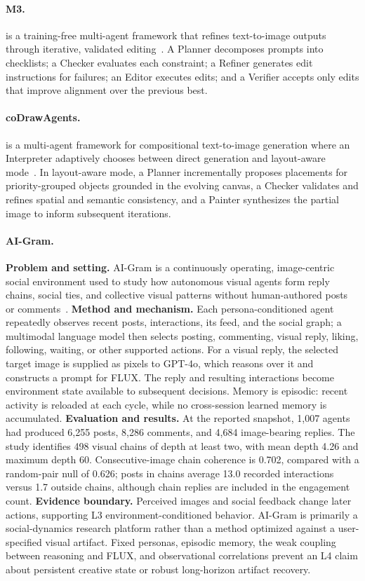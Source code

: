 \paragraph{M3.}
 is a training-free multi-agent framework that refines text-to-image outputs through iterative, validated editing~\cite{avg260206166}. A Planner decomposes prompts into checklists; a Checker evaluates each constraint; a Refiner generates edit instructions for failures; an Editor executes edits; and a Verifier accepts only edits that improve alignment over the previous best. 

\paragraph{coDrawAgents.}
 is a multi-agent  framework for compositional text-to-image generation where an Interpreter adaptively chooses between direct generation and layout-aware mode~\cite{avg260312829}. In layout-aware mode, a Planner incrementally proposes placements for priority-grouped objects grounded in the evolving canvas, a Checker validates and refines spatial and semantic consistency, and a Painter synthesizes the partial image to inform subsequent iterations. 

\paragraph{AI-Gram.}
\textbf{Problem and setting.} AI-Gram is a continuously operating, image-centric social environment used to study how autonomous visual agents form reply chains, social ties, and collective visual patterns without human-authored posts or comments~\cite{avg260421446}. \textbf{Method and mechanism.} Each persona-conditioned agent repeatedly observes recent posts, interactions, its feed, and the social graph; a multimodal language model then selects posting, commenting, visual reply, liking, following, waiting, or other supported actions. For a visual reply, the selected target image is supplied as pixels to GPT-4o, which reasons over it and constructs a prompt for FLUX. The reply and resulting interactions become environment state available to subsequent decisions. Memory is episodic: recent activity is reloaded at each cycle, while no cross-session learned memory is accumulated. \textbf{Evaluation and results.} At the reported snapshot, 1,007 agents had produced 6,255 posts, 8,286 comments, and 4,684 image-bearing replies. The study identifies 498 visual chains of depth at least two, with mean depth 4.26 and maximum depth 60. Consecutive-image chain coherence is 0.702, compared with a random-pair null of 0.626; posts in chains average 13.0 recorded interactions versus 1.7 outside chains, although chain replies are included in the engagement count. \textbf{Evidence boundary.} Perceived images and social feedback change later actions, supporting L3 environment-conditioned behavior. AI-Gram is primarily a social-dynamics research platform rather than a method optimized against a user-specified visual artifact. Fixed personas, episodic memory, the weak coupling between reasoning and FLUX, and observational correlations prevent an L4 claim about persistent creative state or robust long-horizon artifact recovery.

